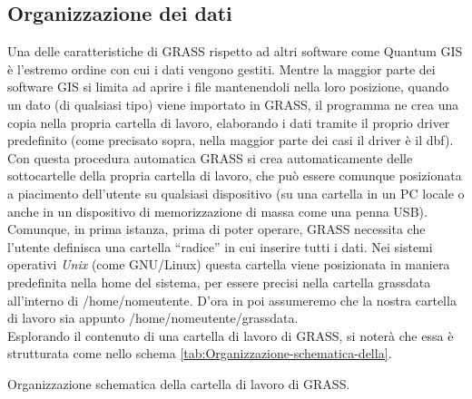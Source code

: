 	\subsection{Organizzazione dei dati}
		Una delle caratteristiche di GRASS rispetto ad altri software come Quantum GIS è l'estremo ordine con cui i dati vengono gestiti. Mentre la maggior parte dei software GIS si limita ad aprire i file mantenendoli nella loro posizione, quando un dato (di qualsiasi tipo) viene importato in GRASS, il programma ne crea una copia nella propria cartella di lavoro, elaborando i dati tramite il proprio driver predefinito (come precisato sopra, nella maggior parte dei casi il driver è il dbf). Con questa procedura automatica GRASS si crea automaticamente delle sottocartelle della propria cartella di lavoro, che può essere comunque posizionata a piacimento dell'utente su qualsiasi dispositivo (su una cartella in un PC locale o anche in un dispositivo di memorizzazione di massa come una penna USB). Comunque, in prima istanza, prima di poter operare, GRASS necessita che l'utente definisca una cartella ``radice'' in cui inserire tutti i dati. Nei sistemi operativi \emph{Unix} (come GNU/Linux) questa cartella viene posizionata in maniera predefinita nella \textsf{home} del sistema, per essere precisi nella cartella \textsf{grassdata} all'interno di \textsf{/home/nomeutente}. D'ora in poi assumeremo che la nostra cartella di lavoro sia appunto \textsf{/home/nomeutente/grassdata}.\\

		Esplorando il contenuto di una cartella di lavoro di GRASS, si noterà che essa è strutturata come nello schema \ref{tab:Organizzazione-schematica-della}.
		
		\begin{table}
			\begin{centering}
			\end{centering}
			\caption{{\small \label{tab:Organizzazione-schematica-della}Organizzazione schematica della cartella di lavoro di GRASS.}}
		\end{table}


